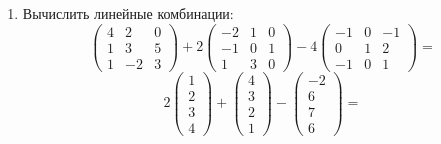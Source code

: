 \begin{enumerate}

\item Вычислить линейные комбинации:
    \[
        \begin{pmatrix}
            4 &  2 & 0 \\
            1 &  3 & 5 \\
            1 & -2 & 3
        \end{pmatrix}
        +2
        \begin{pmatrix}
           -2 &  1 & 0 \\
           -1 &  0 & 1 \\
            1 &  3 & 0
        \end{pmatrix}
        -4
        \begin{pmatrix}
           -1 &  0 & -1 \\
            0 &  1 &  2 \\
           -1 &  0 &  1
        \end{pmatrix}
        =
    \]
    \[
        2
        \begin{pmatrix}
            1 \\
            2 \\
            3 \\
            4
        \end{pmatrix}
        +
        \begin{pmatrix}
            4 \\
            3 \\
            2 \\
            1
        \end{pmatrix}
        -
        \begin{pmatrix}
           -2 \\
            6 \\
            7 \\
            6
        \end{pmatrix}
        =
    \]



\end{enumerate}
